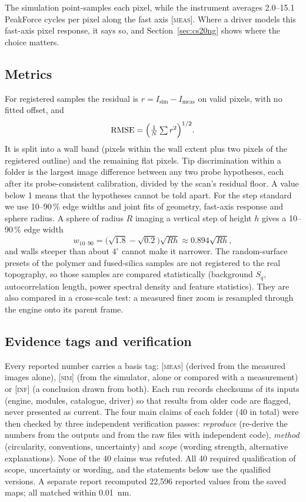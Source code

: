 \documentclass[preprint,12pt]{elsarticle}
\newcommand{\tagm}{\textsc{[meas]}}
\newcommand{\tags}{\textsc{[sim]}}
\newcommand{\tagi}{\textsc{[inf]}}
\begin{document}
The simulation point-samples each pixel, while the instrument averages 2.0--15.1 PeakForce cycles
per pixel along the fast axis \tagm. Where a driver models this fast-axis pixel response, it says
so, and Section~\ref{sec:cs20ng} shows where the choice matters.

\subsection{Metrics}

For registered samples the residual is $r = I_\text{sim} - I_\text{meas}$ on valid pixels, with no
fitted offset, and
\begin{equation}
  \text{RMSE} = \Bigl(\tfrac{1}{N}\textstyle\sum r^2\Bigr)^{1/2}.
\end{equation}
It is split into a wall band (pixels within the wall extent plus two pixels of the registered
outline) and the remaining flat pixels. Tip discrimination within a folder is the largest
image difference between any two probe hypotheses, each after its probe-consistent calibration,
divided by the scan's residual floor. A value below 1 means that the hypotheses cannot be told
apart. For the step standard we use 10--90\,\% edge widths and joint fits of geometry,
fast-axis response and sphere radius. A sphere of radius $R$ imaging a vertical step of height
$h$ gives a 10--90\,\% edge width
\begin{equation}
  w_{10\text{--}90} = \bigl(\sqrt{1.8}-\sqrt{0.2}\bigr)\sqrt{Rh} \approx 0.894\sqrt{Rh},
  \label{eq:edge}
\end{equation}
and walls steeper than about $4^\circ$ cannot make it narrower. The random-surface presets of
the polymer and fused-silica samples are not registered to the real topography, so those samples
are compared statistically (background $S_q$, autocorrelation length, power spectral density and
feature statistics). They are also compared in a cross-scale test: a measured finer zoom is
resampled through the engine onto its parent frame.

\subsection{Evidence tags and verification}

Every reported number carries a basis tag: \tagm{} (derived from the measured images alone),
\tags{} (from the simulator, alone or compared with a measurement) or \tagi{} (a conclusion drawn
from both). Each run records checksums of its inputs (engine, modules, catalogue, driver) so that
results from older code are flagged, never presented as current. The four main claims of each
folder (40 in total) were then checked by three independent verification passes: \emph{reproduce}
(re-derive the numbers from the outputs and from the raw files with independent code),
\emph{method} (circularity, conventions, uncertainty) and \emph{scope} (wording strength,
alternative explanations). None of the 40 claims was refuted. All 40 required qualification of
scope, uncertainty or wording, and the statements below use the qualified versions. A separate
report recomputed 22,596 reported values from the saved maps; all matched within 0.01~nm.
\end{document}

